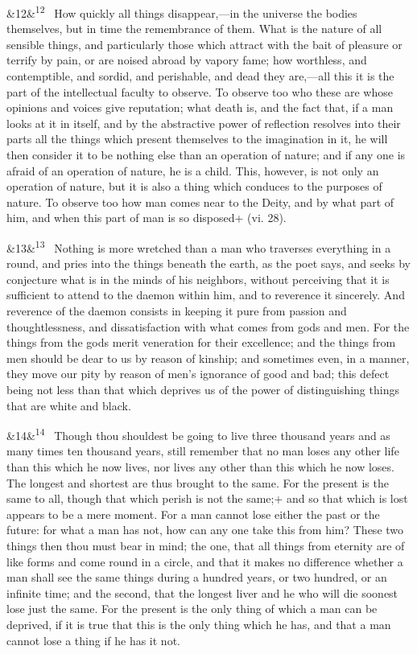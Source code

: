 \documentclass[12pt]{article}
\newcommand{\para}[1][]{\par\noindent\ifx&#1&\else\textsuperscript{\footnotesize #1}~\fi}
\begin{document}
\para[12] How quickly all things disappear,---in the universe the bodies
themselves, but in time the remembrance of them. What is the nature of
all sensible things, and particularly those which attract with the bait
of pleasure or terrify by pain, or are noised abroad by vapory fame; how
worthless, and contemptible, and sordid, and perishable, and dead they
are,---all this it is the part of the intellectual faculty to observe. To
observe too who these are whose opinions and voices give reputation;
what death is, and the fact that, if a man looks at it in itself, and by
the abstractive power of reflection resolves into their parts all the
things which present themselves to the imagination in it, he will then
consider it to be nothing else than an operation of nature; and if any
one is afraid of an operation of nature, he is a child. This, however,
is not only an operation of nature, but it is also a thing which
conduces to the purposes of nature. To observe too how man comes near to
the Deity, and by what part of him, and when this part of man is so
disposed+ (vi. 28).

\para[13] Nothing is more wretched than a man who traverses everything in a
round, and pries into the things beneath the earth, as the poet says,
and seeks by conjecture what is in the minds of his neighbors, without
perceiving that it is sufficient to attend to the daemon within him, and
to reverence it sincerely. And reverence of the daemon consists in
keeping it pure from passion and thoughtlessness, and dissatisfaction
with what comes from gods and men. For the things from the gods merit
veneration for their excellence; and the things from men should be dear
to us by reason of kinship; and sometimes even, in a manner, they move
our pity by reason of men's ignorance of good and bad; this defect being
not less than that which deprives us of the power of distinguishing
things that are white and black.

\para[14] Though thou shouldest be going to live three thousand years and as
many times ten thousand years, still remember that no man loses any
other life than this which he now lives, nor lives any other than this
which he now loses. The longest and shortest are thus brought to the
same. For the present is the same to all, though that which perish is
not the same;+ and so that which is lost appears to be a mere
moment. For a man cannot lose either the past or the future: for what a
man has not, how can any one take this from him? These two things then
thou must bear in mind; the one, that all things from eternity are of
like forms and come round in a circle, and that it makes no difference
whether a man shall see the same things during a hundred years, or two
hundred, or an infinite time; and the second, that the longest liver and
he who will die soonest lose just the same. For the present is the only
thing of which a man can be deprived, if it is true that this is the
only thing which he has, and that a man cannot lose a thing if he has it
not.
\end{document}
